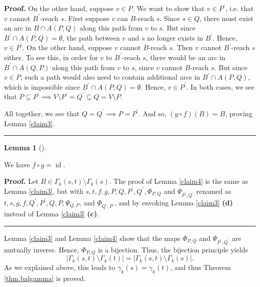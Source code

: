 \documentclass[numbers=enddot,12pt,final,onecolumn,notitlepage]{scrartcl}%
\theoremstyle{definition}
\newtheorem{lem}[theo]{Lemma}
\newenvironment{lemma}[1][]
{\begin{lem}[#1]\begin{leftbar}}
{\end{leftbar}\end{lem}}
\newenvironment{proof}[1][Proof]{\noindent\textbf{#1.} }{\ \rule{0.5em}{0.5em}}
\theoremstyle{plainsl}
\begin{document}
\begin{proof}
On the other hand, suppose $v \in P$. We want to show that $v \in P^{\prime}$,
i.e. that $v$ cannot $B^{\prime}$-reach $s$. First suppose $v$ can $B$-reach
$s$. Since $s \in Q$, there must exist an arc in $B \cap A(P,Q)$ along this
path from $v$ to $s$. But since $B^{\prime}\cap A(P,Q) = \emptyset$, the path
between $v$ and $s$ no longer exists in $B^{\prime}$. Hence, $v \in P^{\prime
}$. On the other hand, suppose $v$ cannot $B$-reach $s$. Then $v$ cannot
$B^{\prime}$-reach $s$ either. To see this, in order for $v$ to $B^{\prime}%
$-reach $s$, there would be an arc in $B^{\prime}\cap A(Q,P)$ along this path
from $v$ to $s$, since $v$ cannot $B$-reach $s$. But since $v \in P$, such a
path would also need to contain additional arcs in $B^{\prime}\cap A(P,Q)$,
which is impossible since $B^{\prime}\cap A(P,Q) = \emptyset$. Hence, $v \in
P^{\prime}$. In both cases, we see that $P \subseteq P^{\prime}\implies V
\setminus P^{\prime}= Q^{\prime}\subseteq Q = V \setminus P$.

All together, we see that $Q = Q^{\prime}\implies P = P^{\prime}$. And so, $(g
\circ f)(B) = B$, proving Lemma \ref{claim3}.
\end{proof}

\begin{lemma}
We have $f\circ g=\operatorname*{id}$.
\end{lemma}

\begin{proof}
\label{claim4}  Let $B \in\Gamma_{k}(s,t) \setminus\Gamma_{k}(s)$. The proof
of Lemma \ref{claim4} is the same as Lemma \ref{claim3}, but with
$s,t,f,g,P,Q,P^{\prime},Q^{\prime},\Phi_{P,Q}$ and $\Psi_{P^{\prime}%
,Q^{\prime}}$ renamed as $t,s,g,f,Q^{\prime},P^{\prime},Q,P,\Psi_{Q,P}$, and
$\Phi_{Q^{\prime},P^{\prime}}$, and by envoking Lemma \ref{claim3}
\textbf{(d)} instead of Lemma \ref{claim3} \textbf{(c)}.
\end{proof}

Lemma \ref{claim3} and Lemma \ref{claim4} show that the maps $\Phi_{P,Q}$ and
$\Psi_{P^{\prime},Q^{\prime}}$ are mutually inverse. Hence, $\Phi_{P,Q}$ is a
bijection. Thus, the bijection principle yields%
\[
\left\vert \Gamma_{k}\left(  s,t\right)  \setminus\Gamma_{k}\left(  t\right)
\right\vert =\left\vert \Gamma_{k}\left(  s,t\right)  \setminus\Gamma
_{k}\left(  s\right)  \right\vert .
\]
As we explained above, this leads to $\gamma_{k}\left(  s\right)  =\gamma
_{k}\left(  t\right)  $, and thus Theorem \ref{thm.balgamma} is proved.
\end{document}
